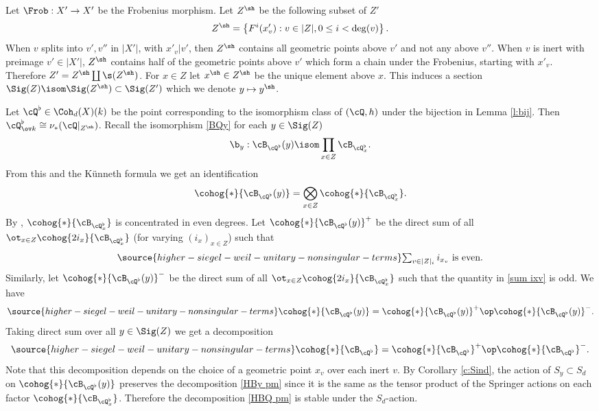 Let $\Frob:X'\to X'$ be the Frobenius morphism.  Let $Z^{\sh}$ be the following subset of $Z'$
\begin{equation*}
Z^{\sh}=\left\{F^{i}(x'_{v}): v\in |Z|, 0\le i<\deg(v)\right\}.
\end{equation*}
When $v$ splits into $v',v''$ in $|X'|$, with $x'_{v}|v'$, then $Z^{\sh}$ contains all geometric points above $v'$ and not any above $v''$. When $v$ is inert with preimage $v'\in|X'|$,  $Z^{\sh}$ contains half of the geometric points above $v'$ which form a chain under the Frobenius, starting with $x'_{v}$. Therefore $Z'=Z^{\sh}\coprod\s(Z^{\sh})$. For $x\in Z$ let $x^{\sh}\in Z^{\sh}$ be the unique element above $x$. This induces a section $\Sig(Z)\isom \Sig(Z^{\sh})\subset \Sig(Z')$ which we denote $y\mapsto y^{\sh}$.

Let $\cQ^{\flat}\in \Coh_{d}(X)(k)$ be the point corresponding to the isomorphism class of $(\cQ,h)$ under the bijection in  Lemma \ref{l:bij}. Then $\cQ^{\flat}_{\ov k}\cong\nu_{*}(\cQ|_{Z^{\sh}})$. Recall the isomorphism \eqref{BQy} for each $y\in \Sig(Z)$
\begin{equation*}
\b_{y}: \cB_{\cQ^{\flat}}(y)\isom \prod_{x\in Z}\cB_{\cQ^{\flat}_{x}}.
\end{equation*}
From this and the K\"unneth formula we get an identification
\begin{equation*}
\cohog{*}{\cB_{\cQ^{\flat}}(y)}=\bigotimes_{x\in Z} \cohog{*}{\cB_{\cQ^{\flat}_{x}}}.
\end{equation*}
By \cite[Corollary 2.3(1)]{HS77}, $\cohog{*}{\cB_{\cQ^{\flat}_{x}}}$ is concentrated in even degrees. Let $\cohog{*}{\cB_{\cQ^{\flat}}(y)}^{+}$ be the direct sum of all $\ot_{x\in Z} \cohog{2i_{x}}{\cB_{\cQ^{\flat}_{x}}}$ (for varying $(i_{x})_{x\in Z}$) such that
\begin{equation}\label{sum ixv}
\source{higher-siegel-weil-unitary-nonsingular-terms}
\mbox{$\sum_{v\in|Z|_{i}}i_{x_{v}}$ is even.}
\end{equation}
Similarly, let $\cohog{*}{\cB_{\cQ^{\flat}}(y)}^{-}$ be the direct sum of all $\ot_{x\in Z} \cohog{2i_{x}}{\cB_{\cQ^{\flat}_{x}}}$ such that the  quantity in \eqref{sum ixv} is odd. We have
\begin{equation}\label{HBy pm}
\source{higher-siegel-weil-unitary-nonsingular-terms}
\cohog{*}{\cB_{\cQ^{\flat}}(y)}=\cohog{*}{\cB_{\cQ^{\flat}}(y)}^{+}\op\cohog{*}{\cB_{\cQ^{\flat}}(y)}^{-}.
\end{equation}
Taking direct sum over all $y\in \Sig(Z)$ we get a decomposition
\begin{equation}\label{HBQ pm}
\source{higher-siegel-weil-unitary-nonsingular-terms}
\cohog{*}{\cB_{\cQ^{\flat}}}=\cohog{*}{\cB_{\cQ^{\flat}}}^{+}\op\cohog{*}{\cB_{\cQ^{\flat}}}^{-}.
\end{equation}
Note that this decomposition depends on the choice of a geometric point $x_{v}$ over each inert $v$. By Corollary \ref{c:Sind}, the action of $S_{y}\subset S_{d}$ on $\cohog{*}{\cB_{\cQ^{\flat}}(y)}$ preserves the decomposition \eqref{HBy pm} since it is the same as the tensor product of the Springer actions on each factor $\cohog{*}{\cB_{\cQ^{\flat}_{x}}}$. Therefore the decomposition \eqref{HBQ pm} is stable under the $S_{d}$-action.

